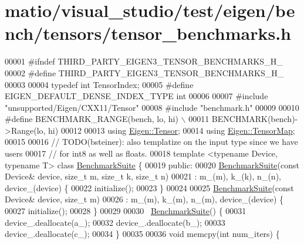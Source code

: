 \hypertarget{matio_2visual__studio_2test_2eigen_2bench_2tensors_2tensor__benchmarks_8h_source}{}\section{matio/visual\+\_\+studio/test/eigen/bench/tensors/tensor\+\_\+benchmarks.h}
\label{matio_2visual__studio_2test_2eigen_2bench_2tensors_2tensor__benchmarks_8h_source}

\begin{DoxyCode}
00001 \textcolor{preprocessor}{#ifndef THIRD\_PARTY\_EIGEN3\_TENSOR\_BENCHMARKS\_H\_}
00002 \textcolor{preprocessor}{#define THIRD\_PARTY\_EIGEN3\_TENSOR\_BENCHMARKS\_H\_}
00003 
00004 \textcolor{keyword}{typedef} \textcolor{keywordtype}{int} TensorIndex;
00005 \textcolor{preprocessor}{#define EIGEN\_DEFAULT\_DENSE\_INDEX\_TYPE int}
00006 
00007 \textcolor{preprocessor}{#include "unsupported/Eigen/CXX11/Tensor"}
00008 \textcolor{preprocessor}{#include "benchmark.h"}
00009 
00010 \textcolor{preprocessor}{#define BENCHMARK\_RANGE(bench, lo, hi) \(\backslash\)}
00011 \textcolor{preprocessor}{  BENCHMARK(bench)->Range(lo, hi)}
00012 
00013 \textcolor{keyword}{using} \hyperlink{class_eigen_1_1_tensor}{Eigen::Tensor};
00014 \textcolor{keyword}{using} \hyperlink{class_eigen_1_1_tensor_map}{Eigen::TensorMap};
00015 
00016 \textcolor{comment}{// TODO(bsteiner): also templatize on the input type since we have users}
00017 \textcolor{comment}{// for int8 as well as floats.}
00018 \textcolor{keyword}{template} <\textcolor{keyword}{typename} Device, \textcolor{keyword}{typename} T> \textcolor{keyword}{class }\hyperlink{class_benchmark_suite}{BenchmarkSuite} \{
00019  \textcolor{keyword}{public}:
00020   \hyperlink{class_benchmark_suite}{BenchmarkSuite}(\textcolor{keyword}{const} Device& device, \textcolor{keywordtype}{size\_t} m, \textcolor{keywordtype}{size\_t} k, \textcolor{keywordtype}{size\_t} n)
00021       : m\_(m), k\_(k), n\_(n), device\_(device) \{
00022     initialize();
00023   \}
00024 
00025   \hyperlink{class_benchmark_suite}{BenchmarkSuite}(\textcolor{keyword}{const} Device& device, \textcolor{keywordtype}{size\_t} m)
00026       : m\_(m), k\_(m), n\_(m), device\_(device) \{
00027     initialize();
00028   \}
00029 
00030   ~\hyperlink{class_benchmark_suite}{BenchmarkSuite}() \{
00031     device\_.deallocate(a\_);
00032     device\_.deallocate(b\_);
00033     device\_.deallocate(c\_);
00034   \}
00035 
00036   \textcolor{keywordtype}{void} memcpy(\textcolor{keywordtype}{int} num\_iters) \{

\end{DoxyCode}
